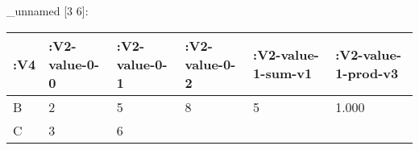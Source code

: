 \documentclass[]{article}
\begin{document}
\_unnamed {[}3 6{]}:

\begin{longtable}[]{@{}llllll@{}}
\toprule
\begin{minipage}[b]{0.05\columnwidth}\raggedright
:V4\strut
\end{minipage} & \begin{minipage}[b]{0.14\columnwidth}\raggedright
:V2-value-0-0\strut
\end{minipage} & \begin{minipage}[b]{0.14\columnwidth}\raggedright
:V2-value-0-1\strut
\end{minipage} & \begin{minipage}[b]{0.14\columnwidth}\raggedright
:V2-value-0-2\strut
\end{minipage} & \begin{minipage}[b]{0.18\columnwidth}\raggedright
:V2-value-1-sum-v1\strut
\end{minipage} & \begin{minipage}[b]{0.19\columnwidth}\raggedright
:V2-value-1-prod-v3\strut
\end{minipage}\tabularnewline
\midrule
\endhead
\begin{minipage}[t]{0.05\columnwidth}\raggedright
B\strut
\end{minipage} & \begin{minipage}[t]{0.14\columnwidth}\raggedright
2\strut
\end{minipage} & \begin{minipage}[t]{0.14\columnwidth}\raggedright
5\strut
\end{minipage} & \begin{minipage}[t]{0.14\columnwidth}\raggedright
8\strut
\end{minipage} & \begin{minipage}[t]{0.18\columnwidth}\raggedright
5\strut
\end{minipage} & \begin{minipage}[t]{0.19\columnwidth}\raggedright
1.000\strut
\end{minipage}\tabularnewline
\begin{minipage}[t]{0.05\columnwidth}\raggedright
C\strut
\end{minipage} & \begin{minipage}[t]{0.14\columnwidth}\raggedright
3\strut
\end{minipage} & \begin{minipage}[t]{0.14\columnwidth}\raggedright
6\strut
\end{minipage} & \begin{minipage}[t]{0.14\columnwidth}\raggedright

\end{minipage}
\end{longtable}
\end{document}
